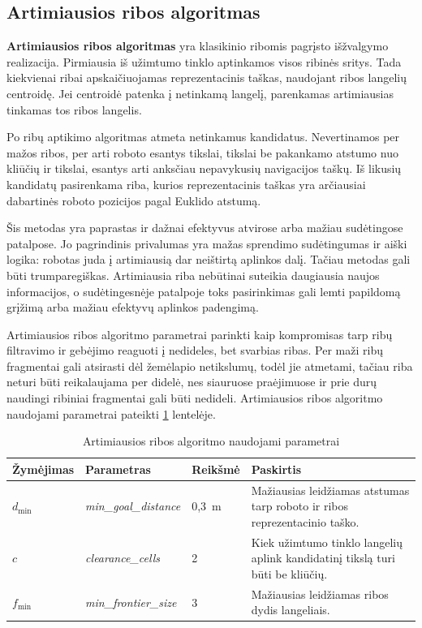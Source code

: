 \documentclass[]{VUMIFTemplateClass}
\begin{document}
\subsection{Artimiausios ribos algoritmas}

\textbf{Artimiausios ribos algoritmas} yra klasikinio ribomis pagrįsto išžvalgymo realizacija. Pirmiausia iš užimtumo tinklo aptinkamos visos ribinės sritys. Tada
kiekvienai ribai apskaičiuojamas reprezentacinis taškas, naudojant ribos langelių centroidę. Jei centroidė patenka į netinkamą langelį, parenkamas
artimiausias tinkamas tos ribos langelis.

Po ribų aptikimo algoritmas atmeta netinkamus kandidatus. Nevertinamos per mažos ribos, per arti roboto esantys tikslai, tikslai be pakankamo atstumo nuo
kliūčių ir tikslai, esantys arti anksčiau nepavykusių navigacijos taškų. Iš likusių kandidatų pasirenkama riba, kurios reprezentacinis taškas yra arčiausiai
dabartinės roboto pozicijos pagal Euklido atstumą.

Šis metodas yra paprastas ir dažnai efektyvus atvirose arba mažiau sudėtingose patalpose. Jo pagrindinis privalumas yra mažas sprendimo sudėtingumas ir aiški
logika: robotas juda į artimiausią dar neištirtą aplinkos dalį. Tačiau metodas gali būti trumparegiškas. Artimiausia riba nebūtinai suteikia daugiausia naujos
informacijos, o sudėtingesnėje patalpoje toks pasirinkimas gali lemti papildomą grįžimą arba mažiau efektyvų aplinkos padengimą.

Artimiausios ribos algoritmo parametrai parinkti kaip kompromisas tarp ribų filtravimo ir gebėjimo reaguoti į nedideles, bet svarbias ribas. Per maži ribų
fragmentai gali atsirasti dėl žemėlapio netikslumų, todėl jie atmetami, tačiau riba neturi būti reikalaujama per didelė, nes siauruose praėjimuose ir prie durų
naudingi ribiniai fragmentai gali būti nedideli. Artimiausios ribos algoritmo naudojami parametrai pateikti \ref{tab:frontier-pseudocode-params} lentelėje.

\begin{table}[H]
\centering
\caption{Artimiausios ribos algoritmo naudojami parametrai}
\label{tab:frontier-pseudocode-params}
\small
\begin{tabular}{|p{1.8cm}|p{3.8cm}|p{2.1cm}|p{6.2cm}|}
\hline
\textbf{Žymėjimas} & \textbf{Parametras} & \textbf{Reikšmė} & \textbf{Paskirtis} \\
\hline
$d_{\min}$ & \textit{min\_goal\_distance} & 0,3~m & Mažiausias leidžiamas atstumas tarp roboto ir ribos reprezentacinio taško. \\
\hline
$c$ & \textit{clearance\_cells} & 2 & Kiek užimtumo tinklo langelių aplink kandidatinį tikslą turi būti be kliūčių. \\
\hline
$f_{\min}$ & \textit{min\_frontier\_size} & 3 & Mažiausias leidžiamas ribos dydis langeliais. \\
\hline
\end{tabular}
\end{table}
\end{document}
